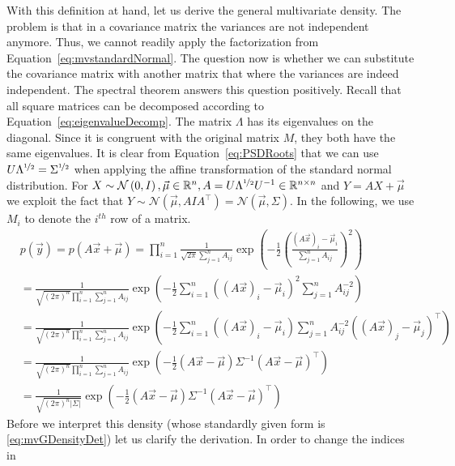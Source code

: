 \documentclass[a4paper,11pt,leqno]{report}\usepackage[]{graphicx}\usepackage[]{color}
\newcommand{\N}[2]{\mathcal{N}\left( #1, #2 \right)}
\begin{document}
With this definition at hand, let us derive the general multivariate density. The problem is that in a covariance matrix the variances are not independent anymore.
Thus, we cannot readily apply the factorization from Equation~\eqref{eq:mvstandardNormal}. The question now is whether we can substitute the covariance matrix with
another matrix that where the variances are indeed independent. The spectral theorem answers this question positively. Recall that all square matrices can be decomposed
according to Equation~\eqref{eq:eigenvalueDecomp}. The matrix $ \Lambda $ has its eigenvalues on the diagonal. Since it is congruent with the original matrix $ M $,
they both have the same eigenvalues. It is clear from Equation~\eqref{eq:PSDRoots} that we can use $ U \Lambda^{\nicefrac{1}{2}} = \Sigma^{\nicefrac{1}{2}} $ when applying the affine transformation of the standard normal distribution.
For $ X \sim \N{0}{I}, \vec{\mu} \in \mathbb{R}^{n}, A = U\Lambda^{\nicefrac{1}{2}}U^{-1} \in \mathbb{R}^{n\times n} $ and $ Y = AX + \vec{\mu} $ we exploit
the fact that $ Y \sim \N{\vec{\mu}}{AIA^{\top}} = \N{\vec{\mu}}{\Sigma} $. In the following, we use $ M_{i} $ to denote the $ i^{th} $ row of a matrix.
\begin{align}
&p(\vec{y}) 
= p(A\vec{x} + \vec{\mu}) = \prod_{i=1}^{n} \frac{1}{\sqrt{2\pi} \sum_{j=1}^{n}A_{ij}} \exp \left(-\frac{1}{2} \left( \frac{(A\vec{x})_{i} - \vec{\mu}_{i}}{\sum_{j=1}^{n}A_{ij}} \right)^{2}  \right) \\
&= \frac{1}{\sqrt{\left( 2\pi \right)^{n}} \prod_{i=1}^{n}\sum_{j=1}^{n}A_{ij}}
\exp \left(-\frac{1}{2} \sum_{i=1}^{n} \left( (A\vec{x})_{i} - \vec{\mu}_{i} \right)^{2} \sum_{j=1}^{n}A_{ij}^{-2} \right) \\
&= \frac{1}{\sqrt{\left( 2\pi \right)^{n}} \prod_{i=1}^{n}\sum_{j=1}^{n}A_{ij}}
\exp \left(-\frac{1}{2} \sum_{i=1}^{n} \left( ( A\vec{x} )_{i} - \vec{\mu}_{i}\right) \sum_{j=1}^{n} A_{ij}^{-2} \left((A\vec{x})_{j} - \vec{\mu}_{j} \right)^{\top} \right) 
\label{eq:quadraticForm} \\
&= \frac{1}{\sqrt{\left( 2\pi \right)^{n}} \prod_{i=1}^{n}\sum_{j=1}^{n}A_{ij}}
\exp \left(-\frac{1}{2} \left( A\vec{x} - \vec{\mu}\right) \Sigma^{-1} \left(A\vec{x} - \vec{\mu} \right)^{\top} \right) \\
&= \frac{1}{\sqrt{\left( 2\pi \right)^{n} |\Sigma|}}
\exp \left(-\frac{1}{2} \left( A\vec{x} - \vec{\mu}\right) \Sigma^{-1} \left(A\vec{x} - \vec{\mu} \right)^{\top} \right) \label{eq:mvGDensityDet}
\end{align}
Before we interpret this density (whose standardly given form is \eqref{eq:mvGDensityDet}) let us clarify the derivation. In order to change the indices in
\end{document}
